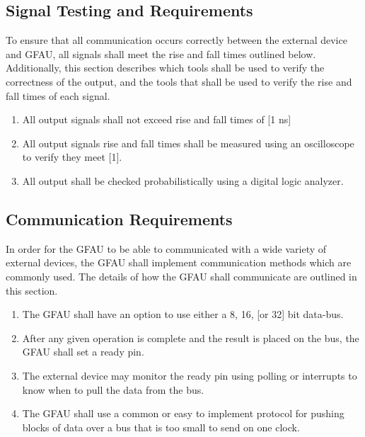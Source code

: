 \documentclass[12pt]{extarticle}
\begin{document}
        \subsection{Signal Testing and Requirements} To ensure that all
        communication occurs correctly between the external device and GFAU,
        all signals shall meet the rise and fall times outlined below.
        Additionally, this section describes which tools shall be used to
        verify the correctness of the output, and the tools that shall be used
        to verify the rise and fall times of each signal.

        \begin{enumerate}

            \item All output signals shall not exceed rise and fall times of [1
            ns]
            
            \item All output signals rise and fall times shall be measured
            using an oscilloscope to verify they meet [1].
            
            \item All output shall be checked probabilistically using a digital
            logic analyzer.

        \end{enumerate}

        \subsection{Communication Requirements} In order for the GFAU to be
        able to communicated with a wide variety of external devices, the GFAU
        shall implement communication methods which are commonly used. The
        details of how the GFAU shall communicate are outlined in this section.

        \begin{enumerate}
            
            \item The GFAU shall have an option to use either a 8, 16, [or 32]
            bit data-bus.
            
            \item After any given operation is complete and the result is
            placed on the bus, the GFAU shall set a ready pin.
            
            \item The external device may monitor the ready pin using polling
            or interrupts to know when to pull the data from the bus.
            
            \item The GFAU shall use a common or easy to implement protocol for
            pushing blocks of data over a bus that is too small to send on one
            clock.

        \end{enumerate}
\end{document}
